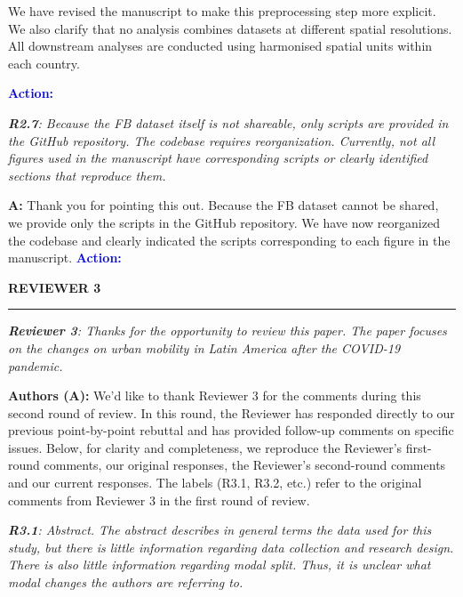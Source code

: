 \documentclass[12pt,a4paper,oneside, reqno]{amsart}
\begin{document}
We have revised the manuscript to make this preprocessing step more explicit. We also clarify that no analysis combines datasets at different spatial resolutions. All downstream analyses are conducted using harmonised spatial units within each country.

\textcolor{blue}{\textbf{Action:}}

\setlength{\leftskip}{0cm} \textit{\textbf{R2.7}: Because the FB dataset itself is not shareable, only scripts are provided in the GitHub repository. The codebase requires reorganization. Currently, not all figures used in the manuscript have corresponding scripts or clearly identified sections that reproduce them.}

\setlength{\leftskip}{1cm}\textbf{A:} Thank you for pointing this out. Because the FB dataset cannot be shared, we provide only the scripts in the GitHub repository. We have now reorganized the codebase and clearly indicated the scripts corresponding to each figure in the manuscript.
\textcolor{blue}{
\textbf{Action:}}

\vspace{10pt}

\setlength{\leftskip}{0cm} \textbf{REVIEWER 3}
\vspace{-16pt}
\begin{center}
    \rule{\textwidth}{.1pt}
\end{center}

\vspace{5pt}

\setlength{\leftskip}{0cm} \textit{\textbf{Reviewer 3}: Thanks for the opportunity to review this paper. The paper focuses on the changes on urban mobility in Latin America after the COVID-19 pandemic.}

\setlength{\leftskip}{1cm}\textbf{Authors (A):} We'd like to thank Reviewer 3 for the comments during this second round of review. In this round, the Reviewer has responded directly to our previous point-by-point rebuttal and has provided follow-up comments on specific issues. Below, for clarity and completeness, we reproduce the Reviewer’s first-round comments, our original responses, the Reviewer’s second-round comments and our current responses. The labels (R3.1, R3.2, etc.) refer to the original comments from Reviewer 3 in the first round of review.

\setlength{\leftskip}{0cm}\textit{\textbf{R3.1}: Abstract. The abstract describes in general terms the data used for this study, but there is little information regarding data collection and research design. There is also little information regarding modal split. Thus, it is unclear what modal changes the authors are referring to.}
\end{document}
